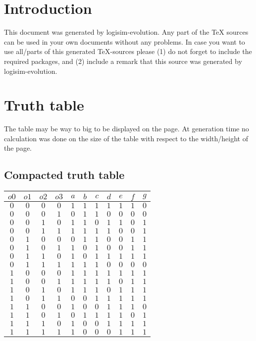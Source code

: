 \documentclass [15pt,a4paper,twoside]{article}
\begin{document}
\section{Introduction}
This document was generated by logisim-evolution. Any part of the TeX sources can be used in your own documents without any problems. In case you want to use all/parts of this generated TeX-sources please (1) do not forget to include the required packages, and (2) include a remark that this source was generated by logisim-evolution.
\section{Truth table}
The table may be way to big to be displayed on the page. At generation time no calculation was done on the size of the table with respect to the width/height of the page.
\subsection{Compacted truth table}
\begin{center}
\begin{tabular}{cccc|ccccccc}
$o0$&$o1$&$o2$&$o3$&$a$&$b$&$c$&$d$&$e$&$f$&$g$\\
\hline
$0$&$0$&$0$&$0$&$1$&$1$&$1$&$1$&$1$&$1$&$0$\\
$0$&$0$&$0$&$1$&$0$&$1$&$1$&$0$&$0$&$0$&$0$\\
$0$&$0$&$1$&$0$&$1$&$1$&$0$&$1$&$1$&$0$&$1$\\
$0$&$0$&$1$&$1$&$1$&$1$&$1$&$1$&$0$&$0$&$1$\\
$0$&$1$&$0$&$0$&$0$&$1$&$1$&$0$&$0$&$1$&$1$\\
$0$&$1$&$0$&$1$&$1$&$0$&$1$&$0$&$0$&$1$&$1$\\
$0$&$1$&$1$&$0$&$1$&$0$&$1$&$1$&$1$&$1$&$1$\\
$0$&$1$&$1$&$1$&$1$&$1$&$1$&$0$&$0$&$0$&$0$\\
$1$&$0$&$0$&$0$&$1$&$1$&$1$&$1$&$1$&$1$&$1$\\
$1$&$0$&$0$&$1$&$1$&$1$&$1$&$1$&$0$&$1$&$1$\\
$1$&$0$&$1$&$0$&$1$&$1$&$1$&$0$&$1$&$1$&$1$\\
$1$&$0$&$1$&$1$&$0$&$0$&$1$&$1$&$1$&$1$&$1$\\
$1$&$1$&$0$&$0$&$1$&$0$&$0$&$1$&$1$&$1$&$0$\\
$1$&$1$&$0$&$1$&$0$&$1$&$1$&$1$&$1$&$0$&$1$\\
$1$&$1$&$1$&$0$&$1$&$0$&$0$&$1$&$1$&$1$&$1$\\
$1$&$1$&$1$&$1$&$1$&$0$&$0$&$0$&$1$&$1$&$1$\\

\end{tabular}
\end{center}
\end{document}
